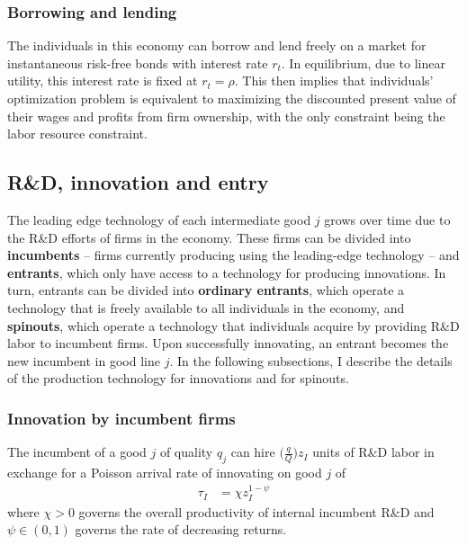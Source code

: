 \documentclass[12pt,english]{article}
\theoremstyle{remark}
\begin{document}
\subsubsection{Borrowing and lending}

The individuals in this economy can borrow and lend freely on a market for instantaneous risk-free bonds with interest rate $r_t$. In equilibrium, due to linear utility, this interest rate is fixed at $r_t = \rho$. This then implies that individuals' optimization problem is equivalent to maximizing the discounted present value of their wages and profits from firm ownership, with the only constraint being the labor resource constraint.



\subsection{R\&D, innovation and entry}

The leading edge technology of each intermediate good $j$ grows over time due to the R\&D efforts of firms in the economy. These firms can be divided into \textbf{incumbents} -- firms currently producing using the leading-edge technology -- and \textbf{entrants}, which only have access to a technology for producing innovations. In turn, entrants can be divided into \textbf{ordinary entrants}, which operate a technology that is freely available to all individuals in the economy, and \textbf{spinouts}, which operate a technology that individuals acquire by providing R\&D labor to incumbent firms. Upon successfully innovating, an entrant becomes the new incumbent in good line $j$. In the following subsections, I describe the details of the production technology for innovations and for spinouts.

\subsubsection{Innovation by incumbent firms}

The incumbent of a good $j$ of quality $q_j$ can hire $\big(\frac{q}{Q}\big)z_I$ units of R\&D labor in exchange for a Poisson arrival rate of innovating on good $j$ of
\begin{align}
\tau_I &= \chi z_I^{1-\psi}  \label{incumbent_innovation_rate}
\end{align}
where $\chi > 0$ governs the overall productivity of internal incumbent R\&D and $\psi \in (0,1)$ governs the rate of decreasing returns. 
\end{document}
